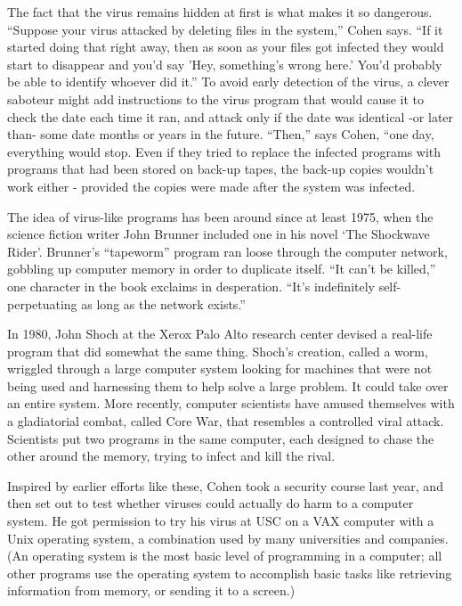   The fact that the virus remains hidden at first is what makes it  so 
dangerous.  ``Suppose  your  virus  attacked by deleting files  in  the 
system,''  Cohen says.  ``If it started doing that right away,  then  as 
soon  as  your files got infected they would start  to  disappear  and 
you'd  say  'Hey,  something's wrong here.' You'd probably be able  to 
identify  whoever did it.''  To avoid early detection of the  virus,  a 
clever saboteur might add instructions to the virus program that would 
cause  it to check the date each time it ran,  and attack only if  the 
date  was identical -or later than- some date months or years  in  the 
future.  ``Then,'' says Cohen,  ``one day, everything would stop. Even if 
they  tried  to replace the infected programs with programs  that  had 
been stored on back-up tapes,  the back-up copies wouldn't work either 
- provided the copies were made after the system was infected.  

  The idea of virus-like programs has been around since at least 1975, 
when the science fiction writer John Brunner included one in his novel 
`The Shockwave Rider'.  Brunner's ``tapeworm'' program ran loose through 
the  computer  network,  gobbling  up  computer  memory  in  order  to 
duplicate  itself.  ``It  can't be killed,'' one character in  the  book 
exclaims in desperation.  ``It's indefinitely self-perpetuating as long 
as the network exists.'' 

  In 1980, John Shoch at the Xerox Palo Alto research center devised a 
real-life program that did somewhat the same thing.  Shoch's creation, 
called  a worm,  wriggled through a large computer system looking  for 
machines  that were not being used and harnessing them to help solve a 
large problem.  It could take over an entire system.   More  recently, 
computer scientists have amused themselves with a gladiatorial combat, 
called Core War, that resembles a controlled viral attack.  Scientists 
put  two  programs in the same computer,  each designed to  chase  the 
other around the memory, trying to infect and kill the rival.  

  Inspired by earlier efforts like these, Cohen took a security course 
last year,  and then set out to test whether viruses could actually do 
harm  to a computer system.  He got permission to try his virus at USC 
on a VAX computer with a Unix operating system,  a combination used by 
many  universities  and companies.  (An operating system is  the  most 
basic level of programming in a computer;  all other programs use  the 
operating system to accomplish basic tasks like retrieving information 
from memory, or sending it to a screen.) 

